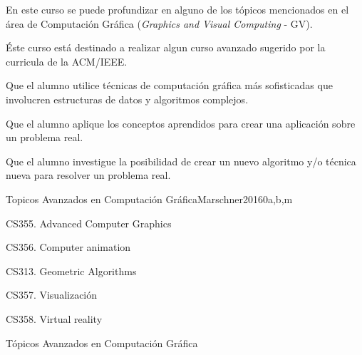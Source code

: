 \begin{syllabus}


\begin{justification}
En este curso se puede profundizar en alguno de los tópicos
mencionados en el área de Computación Gráfica (\textit{Graphics and Visual
Computing} - GV).

Éste curso está destinado a realizar algun curso avanzado sugerido por la curricula de la ACM/IEEE. \cite{Foley13,Hearn90}
\end{justification}

\begin{goals}
\item Que el alumno utilice técnicas de computación gráfica más sofisticadas que involucren estructuras de datos y algoritmos complejos.
\item Que el alumno aplique los conceptos aprendidos para crear una aplicación sobre un problema real.
\item Que el alumno investigue la posibilidad de crear un nuevo algoritmo y/o técnica nueva para resolver un problema real.
\end{goals}



\begin{unit}{Topicos Avanzados en Computación Gráfica}{}{Marschner2016}{0}{a,b,m}
   \begin{topics}
      \item CS355. Advanced Computer Graphics
      \item CS356. Computer animation
      \item CS313. Geometric Algorithms
      \item CS357. Visualización
      \item CS358. Virtual reality
   \end{topics}

   \begin{learningoutcomes}
      \item Tópicos Avanzados en Computación Gráfica
   \end{learningoutcomes}
\end{unit}

\begin{coursebibliography}
\end{coursebibliography}

\end{syllabus}
